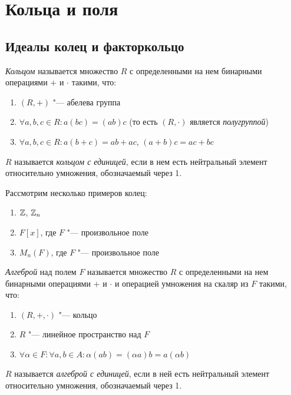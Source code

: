 \section{Кольца и поля}

\subsection{Идеалы колец и факторкольцо}

\begin{reminder}
	\textit{Кольцом} называется множество $R$ с определенными на нем бинарными операциями $+$ и $\cdot$ такими, что:
	\begin{enumerate}
		\item $(R, +)$ "--- абелева группа
		\item $\forall a, b, c \in R: a(bc) = (ab)c$ (то есть $(R, \cdot)$ является \textit{полугруппой})
		\item $\forall a, b, c \in R: a(b + c) = ab + ac$, $(a + b)c = ac + bc$
	\end{enumerate}

	$R$ называется \textit{кольцом с единицей}, если в нем есть нейтральный элемент относительно умножения, обозначаемый через 1.
\end{reminder}

\begin{example}
	Рассмотрим несколько примеров колец:
	\begin{enumerate}
		\item $\mathbb{Z}$, $\mathbb{Z}_n$
		\item $F[x]$, где $F$ "--- произвольное поле
		\item $M_n(F)$, где $F$ "--- произвольное поле
	\end{enumerate}
\end{example}

\begin{reminder}
	\textit{Алгеброй} над полем $F$ называется множество $R$ с определенными на нем бинарными операциями $+$ и $\cdot$ и операцией умножения на скаляр из $F$ такими, что:
	\begin{enumerate}
		\item $(R, +, \cdot)$ "--- кольцо
		\item $R$ "--- линейное пространство над $F$
		\item $\forall \alpha \in F: \forall a, b \in A: \alpha(ab) = (\alpha a)b = a(\alpha b)$
	\end{enumerate}

	$R$ называется \textit{алгеброй с единицей}, если в ней есть нейтральный элемент относительно умножения, обозначаемый через 1.
\end{reminder}

